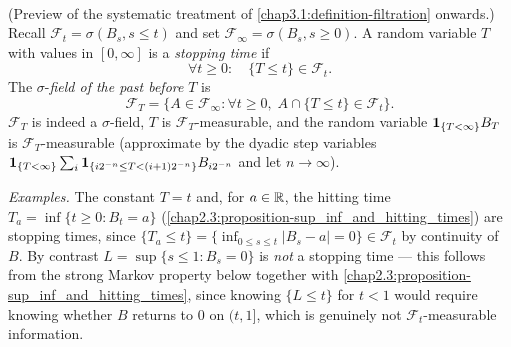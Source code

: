 \begin{definition} \label{chap2.4:definition-stopping_time}  \\
(Preview of the systematic treatment of \cref{chap3.1:definition-filtration} onwards.) Recall $\mathcal F_t=\sigma(B_s,s\le t)$ and set $\mathcal F_\infty=\sigma(B_s,s\ge0)$. A random variable $T$ with values in $[0,\infty]$ is a \textit{stopping time} if
$$\forall t\ge0:\quad \{T\le t\}\in\mathcal F_t.$$
The $\sigma$-\textit{field of the past before} $T$ is
$$\mathcal F_T=\{A\in\mathcal F_\infty : \forall t\ge0,\; A\cap\{T\le t\}\in\mathcal F_t\}.$$
$\mathcal F_T$ is indeed a $\sigma$-field, $T$ is $\mathcal F_T$-measurable, and the random variable $\mathbf{1}_{\{T<\infty\}}B_T$ is $\mathcal F_T$-measurable (approximate by the dyadic step variables $\mathbf{1}_{\{T<\infty\}}\sum_i\mathbf{1}_{\{i2^{-n}\le T<(i+1)2^{-n}\}}B_{i2^{-n}}$ and let $n\to\infty$).

\textit{Examples.} The constant $T=t$ and, for $a\in\mathbb{R}$, the hitting time $T_a=\inf\{t\ge0:B_t=a\}$ (\cref{chap2.3:proposition-sup_inf_and_hitting_times}) are stopping times, since $\{T_a\le t\}=\{\inf_{0\le s\le t}|B_s-a|=0\}\in\mathcal F_t$ by continuity of $B$. By contrast $L=\sup\{s\le1:B_s=0\}$ is \emph{not} a stopping time --- this follows from the strong Markov property below together with \cref{chap2.3:proposition-sup_inf_and_hitting_times}, since knowing $\{L\le t\}$ for $t<1$ would require knowing whether $B$ returns to $0$ on $(t,1]$, which is genuinely not $\mathcal F_t$-measurable information.
\end{definition}

